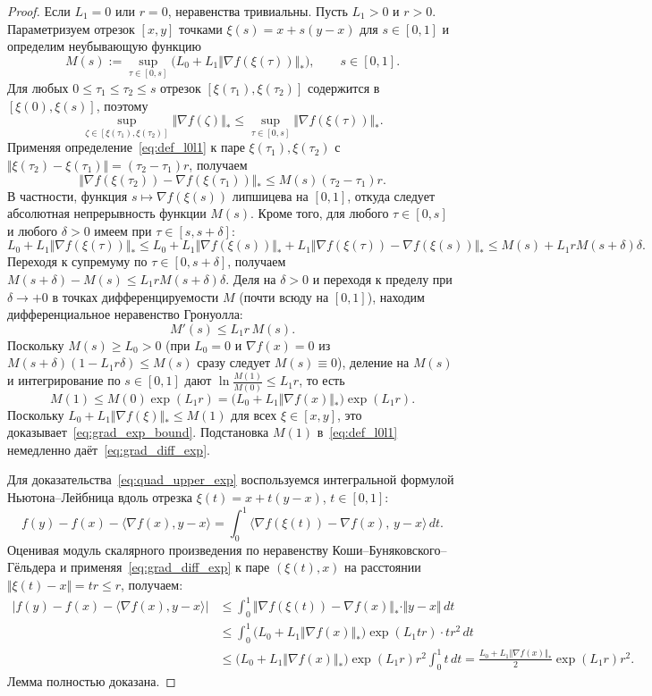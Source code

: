 \documentclass[11pt, a4paper]{article}
\theoremstyle{definition}
\begin{document}
\begin{proof}
Если $L_1 = 0$ или $r = 0$, неравенства тривиальны. Пусть $L_1 > 0$ и $r > 0$. Параметризуем отрезок $[x, y]$ точками $\xi(s) = x + s(y - x)$ для $s \in [0, 1]$ и определим неубывающую функцию
\[
M(s) := \sup_{\tau \in [0, s]} \big(L_0 + L_1 \Vert \nabla f(\xi(\tau)) \Vert_*\big), \qquad s \in [0, 1].
\]
Для любых $0 \le \tau_1 \le \tau_2 \le s$ отрезок $[\xi(\tau_1), \xi(\tau_2)]$ содержится в $[\xi(0), \xi(s)]$, поэтому
\[
\sup_{\zeta \in [\xi(\tau_1), \xi(\tau_2)]} \Vert \nabla f(\zeta) \Vert_* \le \sup_{\tau \in [0, s]} \Vert \nabla f(\xi(\tau)) \Vert_*.
\]
Применяя определение~\eqref{eq:def_l0l1} к паре $\xi(\tau_1), \xi(\tau_2)$ с $\Vert \xi(\tau_2) - \xi(\tau_1) \Vert = (\tau_2 - \tau_1) r$, получаем
\[
\Vert \nabla f(\xi(\tau_2)) - \nabla f(\xi(\tau_1)) \Vert_* \le M(s) (\tau_2 - \tau_1) r.
\]
В частности, функция $s \mapsto \nabla f(\xi(s))$ липшицева на $[0, 1]$, откуда следует абсолютная непрерывность функции $M(s)$. Кроме того, для любого $\tau \in [0, s]$ и любого $\delta > 0$ имеем при $\tau \in [s, s+\delta]$:
\[
L_0 + L_1 \Vert \nabla f(\xi(\tau)) \Vert_* \le L_0 + L_1 \Vert \nabla f(\xi(s)) \Vert_* + L_1 \Vert \nabla f(\xi(\tau)) - \nabla f(\xi(s)) \Vert_* \le M(s) + L_1 r M(s+\delta) \delta.
\]
Переходя к супремуму по $\tau \in [0, s+\delta]$, получаем $M(s+\delta) - M(s) \le L_1 r M(s+\delta) \delta$. Деля на $\delta > 0$ и переходя к пределу при $\delta \to +0$ в точках дифференцируемости $M$ (почти всюду на $[0, 1]$), находим дифференциальное неравенство Гронуолла:
\[
M'(s) \le L_1 r \, M(s).
\]
Поскольку $M(s) \ge L_0 > 0$ (при $L_0 = 0$ и $\nabla f(x) = 0$ из $M(s+\delta)(1 - L_1 r \delta) \le M(s)$ сразу следует $M(s) \equiv 0$), деление на $M(s)$ и интегрирование по $s \in [0, 1]$ дают $\ln \frac{M(1)}{M(0)} \le L_1 r$, то есть
\[
M(1) \le M(0) \exp(L_1 r) = \big(L_0 + L_1 \Vert \nabla f(x) \Vert_*\big) \exp(L_1 r).
\]
Поскольку $L_0 + L_1 \Vert \nabla f(\xi) \Vert_* \le M(1)$ для всех $\xi \in [x, y]$, это доказывает~\eqref{eq:grad_exp_bound}. Подстановка $M(1)$ в~\eqref{eq:def_l0l1} немедленно даёт~\eqref{eq:grad_diff_exp}.

Для доказательства~\eqref{eq:quad_upper_exp} воспользуемся интегральной формулой Ньютона--Лейбница вдоль отрезка $\xi(t) = x + t(y - x)$, $t \in [0, 1]$:
\[
f(y) - f(x) - \langle \nabla f(x), y - x \rangle = \int_0^1 \langle \nabla f(\xi(t)) - \nabla f(x),\, y - x \rangle \, dt.
\]
Оценивая модуль скалярного произведения по неравенству Коши--Буняковского--Гёльдера и применяя~\eqref{eq:grad_diff_exp} к паре $(\xi(t), x)$ на расстоянии $\Vert \xi(t) - x \Vert = t r \le r$, получаем:
\begin{align*}
\big| f(y) - f(x) - \langle \nabla f(x), y - x \rangle \big| &\le \int_0^1 \Vert \nabla f(\xi(t)) - \nabla f(x) \Vert_* \cdot \Vert y - x \Vert \, dt \\
&\le \int_0^1 \big(L_0 + L_1 \Vert \nabla f(x) \Vert_*\big) \exp(L_1 t r) \cdot t r^2 \, dt \\
&\le \big(L_0 + L_1 \Vert \nabla f(x) \Vert_*\big) \exp(L_1 r) r^2 \int_0^1 t \, dt = \frac{L_0 + L_1 \Vert \nabla f(x) \Vert_*}{2} \exp(L_1 r) r^2.
\end{align*}
Лемма полностью доказана.
\end{proof}
\end{document}
